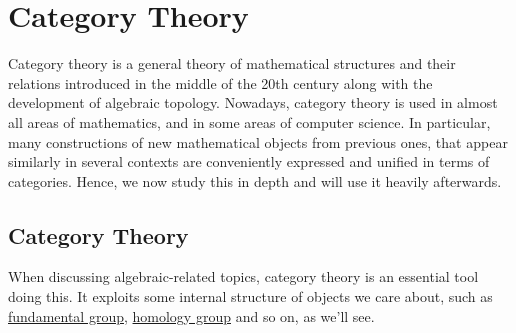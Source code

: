 \chapter{Category Theory}
Category theory is a general theory of mathematical structures and their relations introduced in the middle of the 20th century along with the development
of algebraic topology. Nowadays, category theory is used in almost all areas of mathematics, and in some areas of computer science. In particular, many
constructions of new mathematical objects from previous ones, that appear similarly in several contexts are conveniently expressed and unified in terms of
categories. Hence, we now study this in depth and will use it heavily afterwards.
\section{Category Theory}
When discussing algebraic-related topics, category theory is an essential tool doing this. It exploits some
internal structure of objects we care about, such as \hyperref[def:fundamental-group]{fundamental group},
\hyperref[def:homology-group]{homology group} and so on, as we'll see.

